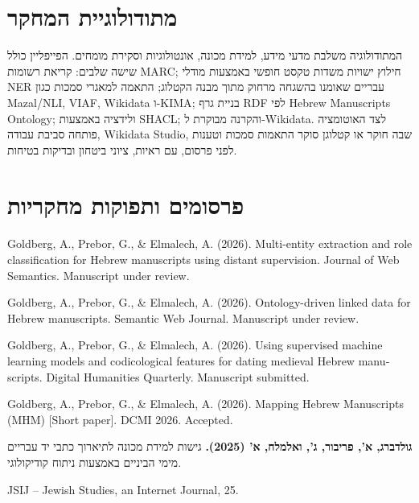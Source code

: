\documentclass[10pt,a4paper]{article}
\newenvironment{englishrefs}{%
  \begin{LTR}\begin{minipage}{\linewidth}\begin{english}\raggedright
}{%
  \end{english}\end{minipage}\end{LTR}
}
\begin{document}
\section*{מתודולוגיית המחקר}
המתודולוגיה משלבת מדעי מידע, למידת מכונה, אונטולוגיות וסקירת מומחים. הפייפליין כולל שישה שלבים: קריאת רשומות \textenglish{MARC}; חילוץ ישויות משדות טקסט חופשי באמצעות מודלי \textenglish{NER} עבריים שאומנו בהשגחה מרחוק מתוך מבנה הקטלוג; התאמה למאגרי סמכות כגון \textenglish{Mazal/NLI}, \textenglish{VIAF}, \textenglish{Wikidata} ו-\textenglish{KIMA}; בניית גרף \textenglish{RDF} לפי \textenglish{Hebrew Manuscripts Ontology}; ולידציה באמצעות \textenglish{SHACL}; והקרנה מבוקרת ל-\textenglish{Wikidata}. לצד האוטומציה פותחה סביבת עבודה, \textenglish{Wikidata Studio}, שבה חוקר או קטלוגן סוקר התאמות סמכות וטענות לפני פרסום, עם ראיות, ציוני ביטחון ובדיקות בטיחות.

\section*{פרסומים ותפוקות מחקריות}
\begingroup
\footnotesize
\begin{englishrefs}
Goldberg, A., Prebor, G., \& Elmalech, A. (2026). Multi-entity extraction and role classification for Hebrew manuscripts using distant supervision. Journal of Web Semantics. Manuscript under review.
\end{englishrefs}
\begin{englishrefs}
Goldberg, A., Prebor, G., \& Elmalech, A. (2026). Ontology-driven linked data for Hebrew manuscripts. Semantic Web Journal. Manuscript under review.
\end{englishrefs}
\begin{englishrefs}
Goldberg, A., Prebor, G., \& Elmalech, A. (2026). Using supervised machine learning models and codicological features for dating medieval Hebrew manuscripts. Digital Humanities Quarterly. Manuscript submitted.
\end{englishrefs}
\begin{englishrefs}
Goldberg, A., Prebor, G., \& Elmalech, A. (2026). Mapping Hebrew Manuscripts (MHM) [Short paper]. DCMI 2026. Accepted.
\end{englishrefs}

\textbf{גולדברג, א', פריבור, ג', ואלמלח, א' (2025).} גישות למידת מכונה לתיארוך כתבי יד עבריים מימי הביניים באמצעות ניתוח קודיקולוגי.\\
\begin{englishrefs}
JSIJ -- Jewish Studies, an Internet Journal, 25.
\end{englishrefs}
\endgroup
\end{document}
